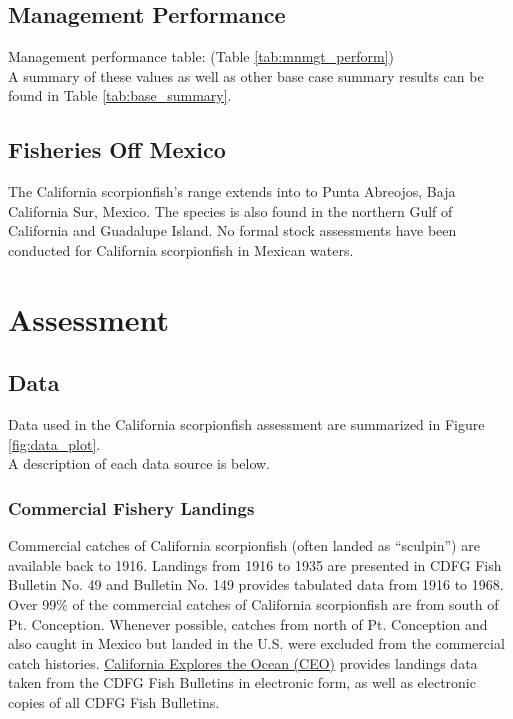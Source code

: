 \documentclass[12pt,]{article}
\begin{document}
\subsection{Management Performance}\label{management-performance-1}

Management performance table: (Table \ref{tab:mnmgt_perform})\\
A summary of these values as well as other base case summary results can
be found in Table \ref{tab:base_summary}.

\subsection{Fisheries Off Mexico}\label{fisheries-off-mexico}

The California scorpionfish's range extends into to Punta Abreojos, Baja
California Sur, Mexico. The species is also found in the northern Gulf
of California and Guadalupe Island. No formal stock assessments have
been conducted for California scorpionfish in Mexican waters.

\section{Assessment}\label{assessment}

\subsection{Data}\label{data}

Data used in the California scorpionfish assessment are summarized in
Figure \ref{fig:data_plot}.\\
A description of each data source is below.

\subsubsection{Commercial Fishery
Landings}\label{commercial-fishery-landings}

Commercial catches of California scorpionfish (often landed as
``sculpin'') are available back to 1916. Landings from 1916 to 1935 are
presented in CDFG Fish Bulletin No. 49 and Bulletin No. 149 provides
tabulated data from 1916 to 1968. Over 99\% of the commercial catches of
California scorpionfish are from south of Pt. Conception. Whenever
possible, catches from north of Pt. Conception and also caught in Mexico
but landed in the U.S. were excluded from the commercial catch
histories.
\href{http://library.ucsd.edu/ceo/fishcatchtables/fish-catch-download.html}{California
Explores the Ocean (CEO)} provides landings data taken from the CDFG
Fish Bulletins in electronic form, as well as electronic copies of all
CDFG Fish Bulletins.
\end{document}
